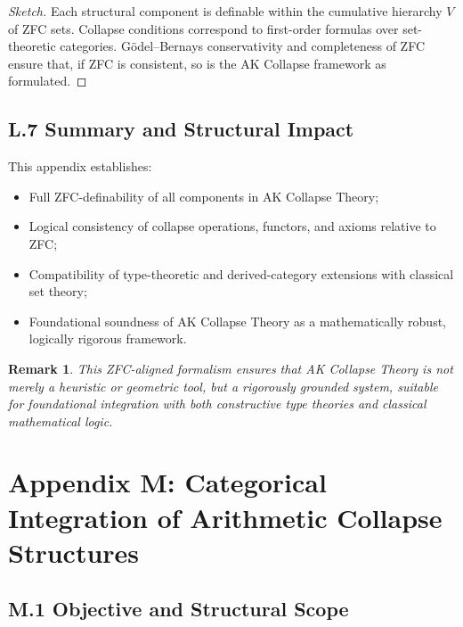 \documentclass[11pt]{article}
\newtheorem{remark}[theorem]{Remark}
\begin{document}
\begin{proof}[Sketch]
Each structural component is definable within the cumulative hierarchy \( V \) of ZFC sets.  
Collapse conditions correspond to first-order formulas over set-theoretic categories.  
Gödel–Bernays conservativity and completeness of ZFC ensure that, if ZFC is consistent, so is the AK Collapse framework as formulated.
\end{proof}

\subsection*{L.7 Summary and Structural Impact}

This appendix establishes:

\begin{itemize}
    \item Full ZFC-definability of all components in AK Collapse Theory;
    \item Logical consistency of collapse operations, functors, and axioms relative to ZFC;
    \item Compatibility of type-theoretic and derived-category extensions with classical set theory;
    \item Foundational soundness of AK Collapse Theory as a mathematically robust, logically rigorous framework.
\end{itemize}

\begin{remark}
This ZFC-aligned formalism ensures that AK Collapse Theory is not merely a heuristic or geometric tool, but a rigorously grounded system, suitable for foundational integration with both constructive type theories and classical mathematical logic.
\end{remark}




\section*{Appendix M: Categorical Integration of Arithmetic Collapse Structures}

\subsection*{M.1 Objective and Structural Scope}
\end{document}
